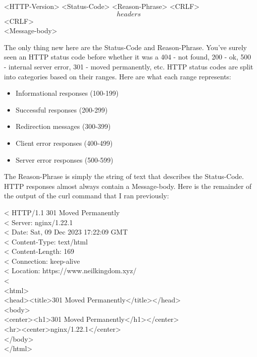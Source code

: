 \documentclass{article}
\begin{document}
<HTTP-Version> <Status-Code> <Reason-Phrase> <CRLF>\\
\[headers\] <CRLF>\\
<Message-body>

The only thing new here are the Status-Code and Reason-Phrase. You've surely seen an HTTP status code before
whether it was a 404 - not found, 200 - ok, 500 - internal server error, 301 - moved permanently, etc.
HTTP status codes are split into categories based on their ranges. Here are what each range represents:

\begin{itemize}

\item{Informational responses (100-199)}

\item{Successful responses (200-299)}

\item{Redirection messages (300-399)}

\item{Client error responses (400-499)}

\item{Server error responses (500-599)}

\end{itemize}

The Reason-Phrase is simply the string of text that describes the Status-Code. HTTP responses almost always
contain a Message-body. Here is the remainder of the output of the curl command that I ran previously:

< HTTP/1.1 301 Moved Permanently\\
< Server: nginx/1.22.1\\
< Date: Sat, 09 Dec 2023 17:22:09 GMT\\
< Content-Type: text/html\\
< Content-Length: 169\\
< Connection: keep-alive\\
< Location: https://www.neilkingdom.xyz/\\
<\\
<html>\\
<head><title>301 Moved Permanently</title></head>\\
<body>\\
<center><h1>301 Moved Permanently</h1></center>\\
<hr><center>nginx/1.22.1</center>\\
</body>\\
</html>
\end{document}
